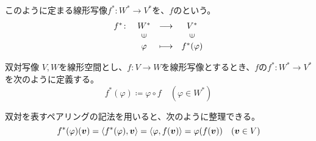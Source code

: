 \documentclass[../../../topic_linear-algebra]{subfiles}
\begin{document}
このように定まる線形写像$f^* \colon W^* \to V^*$を、$f$のという。
\begin{equation*}
  \begin{array}{cccc}
    f^*\colon & W^*         & \longrightarrow & V^*          \\
            & \rotatebox{90}{$\in$} &                 & \rotatebox{90}{$\in$} \\
            & \varphi               & \longmapsto     & f^*(\varphi)
  \end{array}
\end{equation*}

\begin{definition}{双対写像}
  $V,W$を線形空間とし、$f \colon V \to W$を線形写像とするとき、$f$の$f^* \colon W^* \to V^*$を次のように定義する。
  \begin{equation*}
    f^*(\varphi) \coloneq \varphi \circ f \quad (\varphi \in W^*)
  \end{equation*}
\end{definition}

双対を表すペアリングの記法を用いると、次のように整理できる。
\begin{equation*}
  f^*(\varphi)(\vb*{v}) = \langle f^*(\varphi), \vb*{v} \rangle = \langle \varphi, f(\vb*{v}) \rangle = \varphi(f(\vb*{v})) \quad (\vb*{v} \in V)
\end{equation*}
\end{document}

